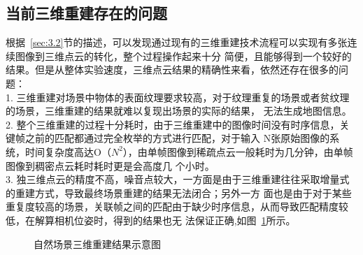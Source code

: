 \subsection{当前三维重建存在的问题}
\label{sec:3.2.3}
根据~\ref{sec:3.2}节的描述，可以发现通过现有的三维重建技术流程可以实现有多张连续图像到三维点云的转化，整个过程操作起来十分
简便，且能够得到一个较好的结果。但是从整体实验速度，三维点云结果的精确性来看，依然还存在很多的问题：\\
1. 三维重建对场景中物体的表面纹理要求较高，对于纹理重复的场景或者贫纹理的场景，三维重建的结果就难以复现出场景的实际的结果，
无法生成地图信息。\\
2. 整个三维重建的过程十分耗时，由于三维重建中的图像时间没有时序信息，关键帧之前的匹配都通过完全枚举的方式进行匹配，对于输入
N张原始图像的系统，时间复杂度高达O（$N^2$），由单帧图像到稀疏点云一般耗时为几分钟，由单帧图像到稠密点云耗时耗时更是会高度几
个小时。\\
3. 独三维点云的精度不高，噪音点较大，一方面是由于三维重建往往采取增量式的重建方式，导致最终场景重建的结果无法闭合；另外一方
面也是由于对于某些重复度较高的场景，关联帧之间的匹配由于缺少时序信息，从而导致匹配精度较低，在解算相机位姿时，得到的结果也无
法保证正确,如图~\ref{fig:chap2:3dconstr_stone}所示。
\begin{figure}[htbp]
  \centering
  \vskip0.5cm
  \caption{自然场景三维重建结果示意图}\label{fig:chap2:3dconstr_stone}
\end{figure}
